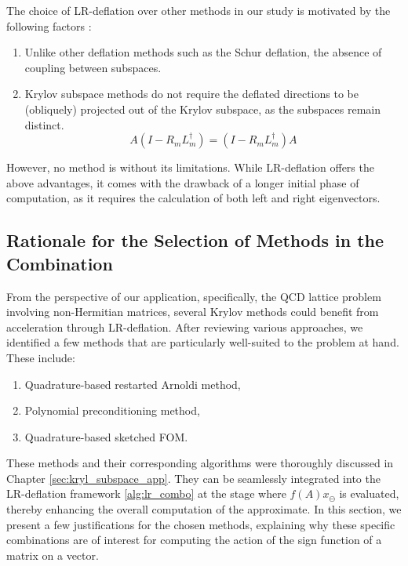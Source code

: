 The choice of LR-deflation over other methods in our study is motivated by the following factors \cite{11}:
\begin{enumerate}
    \item Unlike other deflation methods such as the Schur deflation, the absence of coupling between subspaces.
    \item Krylov subspace methods do not require the deflated directions to be (obliquely) projected out of the Krylov subspace, as the subspaces remain distinct.
    \begin{equation}
        A(I-R_mL_m^{\dagger})=(I-R_mL_m^{\dagger})A
    \end{equation}
\end{enumerate}

However, no method is without its limitations. While LR-deflation offers the above advantages, it comes with the drawback of a longer initial phase of computation, as it requires the calculation of both left and right eigenvectors. 

\subsection{Rationale for the Selection of Methods in the Combination}
\label{sec:rationale_selec_method_in_combo}

From the perspective of our application, specifically, the QCD lattice problem involving non-Hermitian matrices, several Krylov methods could benefit from acceleration through LR-deflation. After reviewing various approaches, we identified a few methods that are particularly well-suited to the problem at hand. These include:
\begin{enumerate}
    \item Quadrature-based restarted Arnoldi method,
    \item Polynomial preconditioning method,
    \item Quadrature-based sketched FOM.
\end{enumerate}

These methods and their corresponding algorithms were thoroughly discussed in Chapter \ref{sec:kryl_subspace_app}. They can be seamlessly integrated into the LR-deflation framework \ref{alg:lr_combo} at the stage where $f(A)x_{\ominus}$ is evaluated, thereby enhancing the overall computation of the approximate. In this section, we present a few justifications for the chosen methods, explaining why these specific combinations are of interest for computing the action of the sign function of a matrix on a vector.

